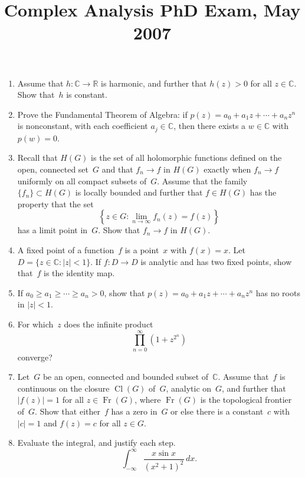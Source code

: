 \documentclass[11pt,letterpaper]{article}
\title{Complex Analysis PhD Exam, May 2007}
\author{}
\date{}
\newenvironment{examproblems}[2]{%
  \def\ProblemHeadingTag{#2}%
  \AssignTaggingSocketPlug{block/list/label}{examproblem}%
  \begin{enumerate}%
  \setcounter{enumi}{#1}%
  \renewcommand{\labelenumi}{\textbf{\theenumi.}}%
  \setlength{\topsep}{0.35em}%
  \setlength{\partopsep}{0pt}%
  \setlength{\itemsep}{0.48em}%
  \setlength{\parsep}{0.18em}%
}{\end{enumerate}}
\begin{document}
\maketitle
\thispagestyle{empty}
\begin{examproblems}{0}{H2}
\def\ProblemHeadingText{Problem 1.}
\item
Assume that \(h:\mathbb{C}\to\mathbb{R}\) is harmonic, and further that \(h(z)>0\) for all \(z\in\mathbb{C}\). Show that~\(h\) is constant.
\def\ProblemHeadingText{Problem 2.}
\item
Prove the Fundamental Theorem of Algebra: if \(p(z)=a_0+a_1z+\cdots+a_nz^n\) is nonconstant, with each coefficient \(a_j\in\mathbb{C}\), then there exists a \(w\in\mathbb{C}\) with \(p(w)=0\).
\def\ProblemHeadingText{Problem 3.}
\item
Recall that \(H(G)\) is the set of all holomorphic functions defined on the open, connected set~\(G\) and that \(f_n\to f\) in \(H(G)\) exactly when \(f_n\to f\) uniformly on all compact subsets of~\(G\). Assume that the family \(\{f_n\}\subset H(G)\) is locally bounded and further that \(f\in H(G)\) has the property that the set
\[
\left\{z\in G:\lim_{n\to\infty}f_n(z)=f(z)\right\}
\]
 has a limit point in~\(G\). Show that \(f_n\to f\) in \(H(G)\).
\def\ProblemHeadingText{Problem 4.}
\item
A fixed point of a function~\(f\) is a point~\(x\) with \(f(x)=x\). Let \(D=\{z\in\mathbb{C}:|z|<1\}\). If \(f:D\to D\) is analytic and has two fixed points, show that~\(f\) is the identity map.
\def\ProblemHeadingText{Problem 5.}
\item
If \(a_0\geq a_1\geq\cdots\geq a_n>0\), show that \(p(z)=a_0+a_1z+\cdots+a_nz^n\) has no roots in \(|z|<1\).
\def\ProblemHeadingText{Problem 6.}
\item
For which~\(z\) does the infinite product
\[
\prod_{n=0}^{\infty}\left(1+z^{2^n}\right)
\]
 converge?
\def\ProblemHeadingText{Problem 7.}
\item
Let~\(G\) be an open, connected and bounded subset of~\(\mathbb{C}\). Assume that~\(f\) is continuous on the closure \(\operatorname{Cl}(G)\) of~\(G\), analytic on~\(G\), and further that \(|f(z)|=1\) for all \(z\in\operatorname{Fr}(G)\), where \(\operatorname{Fr}(G)\) is the topological frontier of~\(G\). Show that either~\(f\) has a zero in~\(G\) or else there is a constant~\(c\) with \(|c|=1\) and \(f(z)=c\) for all \(z\in G\).
\def\ProblemHeadingText{Problem 8.}
\item
Evaluate the integral, and justify each step.
\[
\int_{-\infty}^{\infty}\frac{x\sin x}{(x^2+1)^2}\,dx.
\]
\end{examproblems}
\end{document}
